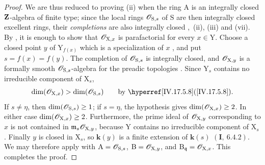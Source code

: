 \begin{proof}
We are thus reduced to proving (ii) when the ring $\mathrm{A}$ is an integrally closed $\mathbf{Z}$-algebra of finite type; since the local rings $\mathscr{O}_{\mathrm{S},s}$ of $\mathrm{S}$ are then integrally closed excellent rings, their \emph{completions} are also integrally closed ,~(ii), (iii) and (vii). By , it is enough to show that $\mathscr{O}_{\mathrm{X},x}$ is parafactorial for every $x\in\mathrm{Y}$. Choose a closed point $y$ of $\mathrm{Y}_{f(x)}$ which is a specialization of $x$ , and put $s=f(x)=f(y)$. The completion of $\mathscr{O}_{\mathrm{S},s}$ is integrally closed, and $\mathscr{O}_{\mathrm{X},y}$ is a formally smooth $\mathscr{O}_{\mathrm{S},s}$-algebra for the preadic topologies . Since $\mathrm{Y}_s$ contains no irreducible component of $\mathrm{X}_s$,
\[
  \dim(\sh{O}_{\mathrm{X},x})>\dim(\sh{O}_{\mathrm{S},s})
  \qquad\text{by \sref{IV.17.5.8}}.
\]
If $s\neq\eta$, then $\dim(\mathscr{O}_{\mathrm{S},s})\geq1$; if $s=\eta$, the hypothesis gives $\dim(\mathscr{O}_{\mathrm{X},x})\geq2$. In either case $\dim(\mathscr{O}_{\mathrm{X},x})\geq2$. Furthermore, the prime ideal of $\mathscr{O}_{\mathrm{X},y}$ corresponding to $x$ is not contained in $\mathfrak{m}_s\mathscr{O}_{\mathrm{X},y}$, because $\mathrm{Y}$ contains no irreducible component of $\mathrm{X}_s$. Finally $y$ is closed in $\mathrm{X}_s$, so $\boldsymbol{k}(y)$ is a finite extension of $\boldsymbol{k}(s)$ $(\mathbf{I},\ 6.4.2)$. We may therefore apply  with $\mathrm{A}=\mathscr{O}_{\mathrm{S},s}$, $\mathrm{B}=\mathscr{O}_{\mathrm{X},y}$, and $\mathrm{B}_{\mathfrak{q}}=\mathscr{O}_{\mathrm{X},x}$. This completes the proof.
\end{proof}

